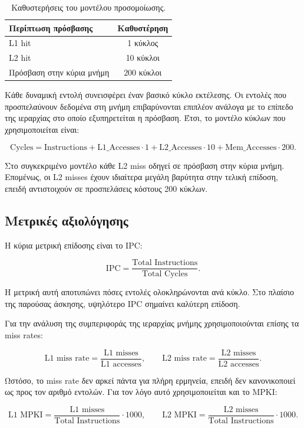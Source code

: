 \documentclass{article}
\begin{document}
\begin{table}[htbp]
\centering
\caption{Καθυστερήσεις του μοντέλου προσομοίωσης.}
\label{tab:latencies}
\begin{tabular}{lc}
\toprule
\textbf{Περίπτωση πρόσβασης} & \textbf{Καθυστέρηση} \\
\midrule
L1 hit & 1 κύκλος \\
L2 hit & 10 κύκλοι \\
Πρόσβαση στην κύρια μνήμη & 200 κύκλοι \\
\bottomrule
\end{tabular}
\end{table}

Κάθε δυναμική εντολή συνεισφέρει έναν βασικό κύκλο εκτέλεσης. Οι εντολές που προσπελαύνουν δεδομένα στη μνήμη επιβαρύνονται επιπλέον ανάλογα με το επίπεδο της ιεραρχίας στο οποίο εξυπηρετείται η πρόσβαση. Έτσι, το μοντέλο κύκλων που χρησιμοποιείται είναι:

\[
\text{Cycles} = \text{Instructions}
+ \text{L1\_Accesses}\cdot 1
+ \text{L2\_Accesses}\cdot 10
+ \text{Mem\_Accesses}\cdot 200.
\]

Στο συγκεκριμένο μοντέλο κάθε L2 miss οδηγεί σε πρόσβαση στην κύρια μνήμη. Επομένως, οι L2 misses έχουν ιδιαίτερα μεγάλη βαρύτητα στην τελική επίδοση, επειδή αντιστοιχούν σε προσπελάσεις κόστους 200 κύκλων.

\subsection{Μετρικές αξιολόγησης}

Η κύρια μετρική επίδοσης είναι το IPC:

\[
\text{IPC} = \frac{\text{Total Instructions}}{\text{Total Cycles}}.
\]

Η μετρική αυτή αποτυπώνει πόσες εντολές ολοκληρώνονται ανά κύκλο. Στο πλαίσιο της παρούσας άσκησης, υψηλότερο IPC σημαίνει καλύτερη επίδοση.

Για την ανάλυση της συμπεριφοράς της ιεραρχίας μνήμης χρησιμοποιούνται επίσης τα miss rates:

\[
\text{L1 miss rate} = \frac{\text{L1 misses}}{\text{L1 accesses}},
\qquad
\text{L2 miss rate} = \frac{\text{L2 misses}}{\text{L2 accesses}}.
\]

Ωστόσο, το miss rate δεν αρκεί πάντα για πλήρη ερμηνεία, επειδή δεν κανονικοποιεί ως προς τον αριθμό εντολών. Για τον λόγο αυτό χρησιμοποιείται και το MPKI:

\[
\text{L1 MPKI} = \frac{\text{L1 misses}}{\text{Total Instructions}}\cdot 1000,
\qquad
\text{L2 MPKI} = \frac{\text{L2 misses}}{\text{Total Instructions}}\cdot 1000.
\]
\end{document}
